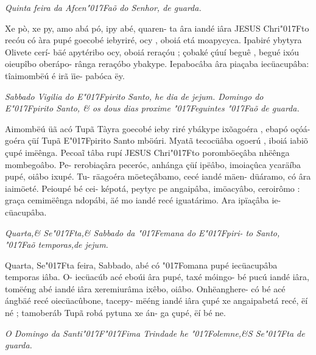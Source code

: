 \documentclass[openany,titlepage,12pt]{book}
\newcommand{\lgS}{\char"017F}
\newcommand{\lgSS}{\char"017F\char"017F}
\begin{document}
\begin{center}
    \textit{\footnotesize Quinta feira da Afcen\lgS aõ do Senhor, de guarda.}
\end{center}

{\hspace*{-2ex}Xe pò, xe py, amo abá pó, ipy abé, quaren-
ta âra iandé iâra JESUS Chri\lgS to  recóu có
àra pupé goecobé iebyriré, ocy , oboiá etá
moapycyca. Ipabiré ybytyra Olivete cerí-
bäé apytéribo ocy, oboiá reraçóu ; çobaké
çúuí beguê , begué ixóu oieupîbo oberápo-
rânga reraçóbo ybakype. Iepabocâba âra
piaçaba iecüacupâba: tîaimombëú é irã ïie-
pabóca ëy.}

\begin{center}
    \textit{\footnotesize Sabbado Vigilia do E\lgS pirito Santo, he dia de jejum.
    Domingo do E\lgS pirito Santo, \& os dous dias\linebreak
    proxime \lgS eguintes \lgS aõ de guarda.}
\end{center}

{\hspace*{-2ex}Aimombëú üã acó Tupã Tàyra goecobé
ieby riré ybákype ixõagoéra , ebapó oçóá-
goéra çüí Tupã E\lgS pirito Santo mböúri.\linebreak
Myatã tecocüâba ogoerú , iboiá iabiõ çupé
imëênga. Pecoa\~i tâba rupí JESUS Chri\lgS to 
poromböeçâba nhëênga mombegoâbo. Pe-
rerobiaçâra peceróc, anhánga çüí ipëâbo,
imoiaçûca ycaräíba pupé, oiâbo ixupé. Tu-
räagoéra möeteçâbamo, cecé iandé mäen-
düáramo, có âra iaimöeté. Peioupé bé cei-
képotá, peytyc pe angaipâba, imöacyâbo,
ceroirômo : graça cemimëênga ndopábi, äé
mo iandé recé iguatárimo. Ara ipïaçâba ie-
cüacupâba.}

\begin{center}
    \textit{\footnotesize Quarta,\& Se\lgS ta,\& Sabbado da \lgS emana do E\lgS piri-
    to Santo, \lgS aõ temporas,de jejum.
    }
\end{center}

{\hspace*{-2ex}Quarta, Se\lgS ta feira, Sabbado, abé có \lgS omana
pupé iecüacupâba temporas iâba. O-
iecüacúb acé eboúi âra pupé, taxé móingo-
bé pucú iandé iâra, tomëéng abé iandé iâra
xeremiurâma ixêbo, oiâbo. Onhëanghere-
có bé acé ángbäé recé oiecüacûbone, tacepy-
mëéng iandé iâra çupé xe angaipabetá recé,
ëí né ; tamoberáb Tupã robá pytuna xe án-
ga çupé, ëí bé ne.}

\begin{center}
    \textit{\small O Domingo da Santi\lgSS ima Trindade he \lgS olemne,\&S
    Se\lgS ta de guarda.
    }
\end{center}
\end{document}
